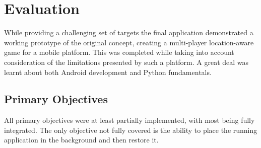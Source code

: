\chapter{Evaluation}






While providing a challenging set of targets the final application demonstrated a working prototype of the original concept, creating a multi-player location-aware game for a mobile platform. This was completed while taking into account consideration of the limitations presented by such a platform. A great deal was learnt about both Android development and Python fundamentals.

\section{Primary Objectives}
All primary objectives were at least partially implemented, with most being fully integrated. The only objective not fully covered is the ability to place the running application in the background and then restore it.


